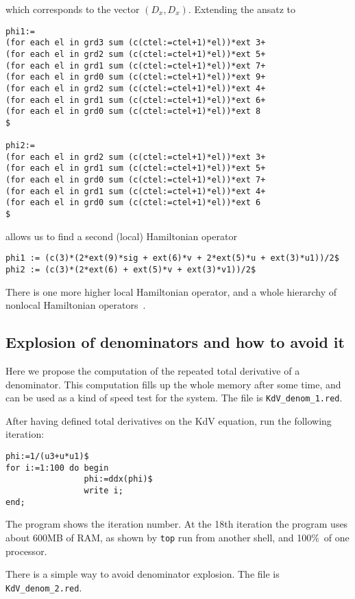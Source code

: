 \documentclass[12pt]{amsart}
\theoremstyle{definition}
\begin{document}
which corresponds to the vector $(D_x,D_x)$.  Extending the ansatz to
\begin{verbatim}
phi1:=
(for each el in grd3 sum (c(ctel:=ctel+1)*el))*ext 3+
(for each el in grd2 sum (c(ctel:=ctel+1)*el))*ext 5+
(for each el in grd1 sum (c(ctel:=ctel+1)*el))*ext 7+
(for each el in grd0 sum (c(ctel:=ctel+1)*el))*ext 9+
(for each el in grd2 sum (c(ctel:=ctel+1)*el))*ext 4+
(for each el in grd1 sum (c(ctel:=ctel+1)*el))*ext 6+
(for each el in grd0 sum (c(ctel:=ctel+1)*el))*ext 8
$

phi2:=
(for each el in grd2 sum (c(ctel:=ctel+1)*el))*ext 3+
(for each el in grd1 sum (c(ctel:=ctel+1)*el))*ext 5+
(for each el in grd0 sum (c(ctel:=ctel+1)*el))*ext 7+
(for each el in grd1 sum (c(ctel:=ctel+1)*el))*ext 4+
(for each el in grd0 sum (c(ctel:=ctel+1)*el))*ext 6
$
\end{verbatim}
allows us to find a second (local) Hamiltonian operator
\begin{verbatim}
phi1 := (c(3)*(2*ext(9)*sig + ext(6)*v + 2*ext(5)*u + ext(3)*u1))/2$
phi2 := (c(3)*(2*ext(6) + ext(5)*v + ext(3)*v1))/2$
\end{verbatim}
There is one more higher local Hamiltonian operator, and a whole hierarchy of
nonlocal Hamiltonian operators~\cite{KKV}.


\subsection{Explosion of denominators and how to avoid it}

Here we propose the computation of the repeated total derivative of a
denominator. This computation fills up the whole memory after some time, and
can be used as a kind of speed test for the system. The file is
\texttt{KdV\_denom\_1.red}.

After having defined total derivatives on the KdV equation, run the following
iteration:
\begin{verbatim}
phi:=1/(u3+u*u1)$
for i:=1:100 do begin
                phi:=ddx(phi)$
                write i;
end;
\end{verbatim}
The program shows the iteration number. At the 18th iteration the program uses
about 600MB of RAM, as shown by \texttt{top} run from another shell, and 100\%\
of one processor.

There is a simple way to avoid denominator explosion. The file is
\texttt{KdV\_denom\_2.red}.
\end{document}
